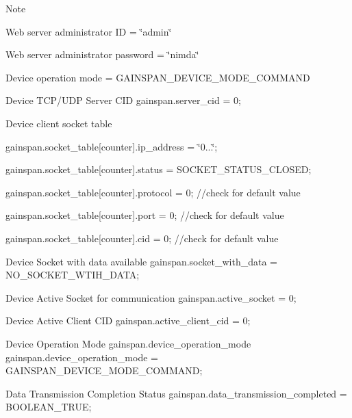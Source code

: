 \begin{DoxyNote}{Note}
\begin{DoxyItemize}
\item Web server administrator ID = \char`\"{}admin\char`\"{}
\item Web server administrator password = \char`\"{}nimda\char`\"{}
\item Device operation mode = G\+A\+I\+N\+S\+P\+A\+N\+\_\+\+D\+E\+V\+I\+C\+E\+\_\+\+M\+O\+D\+E\+\_\+\+C\+O\+M\+M\+A\+ND
\item Device T\+C\+P/\+U\+DP Server C\+ID gainspan.\+server\+\_\+cid = 0;
\item Device client socket table
\begin{DoxyItemize}
\item gainspan.\+socket\+\_\+table\mbox{[}counter\mbox{]}.ip\+\_\+address = \char`\"{}0...\char`\"{};
\item gainspan.\+socket\+\_\+table\mbox{[}counter\mbox{]}.status = S\+O\+C\+K\+E\+T\+\_\+\+S\+T\+A\+T\+U\+S\+\_\+\+C\+L\+O\+S\+ED;
\item gainspan.\+socket\+\_\+table\mbox{[}counter\mbox{]}.protocol = 0; //check for default value
\item gainspan.\+socket\+\_\+table\mbox{[}counter\mbox{]}.port = 0; //check for default value
\item gainspan.\+socket\+\_\+table\mbox{[}counter\mbox{]}.cid = 0; //check for default value
\end{DoxyItemize}
\item Device Socket with data available gainspan.\+socket\+\_\+with\+\_\+data = N\+O\+\_\+\+S\+O\+C\+K\+E\+T\+\_\+\+W\+T\+I\+H\+\_\+\+D\+A\+TA;
\item Device Active Socket for communication gainspan.\+active\+\_\+socket = 0;
\item Device Active Client C\+ID gainspan.\+active\+\_\+client\+\_\+cid = 0;
\end{DoxyItemize}
\end{DoxyNote}

\begin{DoxyItemize}
\item Device Operation Mode gainspan.\+device\+\_\+operation\+\_\+mode gainspan.\+device\+\_\+operation\+\_\+mode = G\+A\+I\+N\+S\+P\+A\+N\+\_\+\+D\+E\+V\+I\+C\+E\+\_\+\+M\+O\+D\+E\+\_\+\+C\+O\+M\+M\+A\+ND;
\item Data Transmission Completion Status gainspan.\+data\+\_\+transmission\+\_\+completed = B\+O\+O\+L\+E\+A\+N\+\_\+\+T\+R\+UE; 
\end{DoxyItemize}

